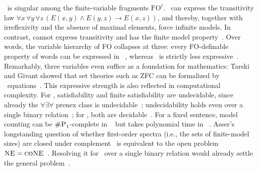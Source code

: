 \smallskip
{}
\FOthree\ is singular among the finite-variable fragments $\mathrm{FO}^{\ell}$.
\FOthree\ can express the transitivity law
$\forall x\,\forall y\,\forall z\,(E(x,y)\land E(y,z)\to E(x,z))$,
and thereby, together with irreflexivity and the absence of maximal elements, force infinite models.
In contrast, \FOtwo{} cannot express transitivity and has the finite model property~\citep{mortimer1975}.
Over words, the variable hierarchy of FO collapses at three: every FO-definable property of words can be expressed in \FOthree~\citep{immerman-kozen1989}, whereas \FOtwo\ is strictly less expressive~\citep{etessami-vardi-wilke2002}.
%
Remarkably, three variables even suffice as a foundation for mathematics: Tarski and Givant showed that set theories such as ZFC can be formalized by \CoR\ equations~\citep{tarski-givant1987,givant2006,maddux2021}.
%
This expressive strength is also reflected in computational complexity.
For \FOthree, satisfiability and finite satisfiability are undecidable, since already the $\forall\exists\forall$ prenex class is undecidable~\citep{kahr-moore-wang1962,borger-gradel-gurevich1997}; undecidability holds even over a single binary relation~\citep{nakamura2019}; %
for \FOtwo, both are decidable~\citep{mortimer1975}.
%
For a fixed sentence, model counting can be $\textsc{\#P}_1$-complete in \FOthree~\citep{beame2015} but takes polynomial time in \FOtwo~\citep{vandenbroeck-meert-darwiche2014}.
Asser's longstanding question of whether first-order spectra (i.e., the sets of finite-model sizes) are closed under complement~\citep{asser1955} is equivalent to the open problem $\textsc{NE} = \textsc{coNE}$~\citep{jones-selman1974}.
Resolving it for \FOthree\ over a single binary relation would already settle the general problem~\citep{kopczynski-tan2015,kopczynski-tan2018}.


